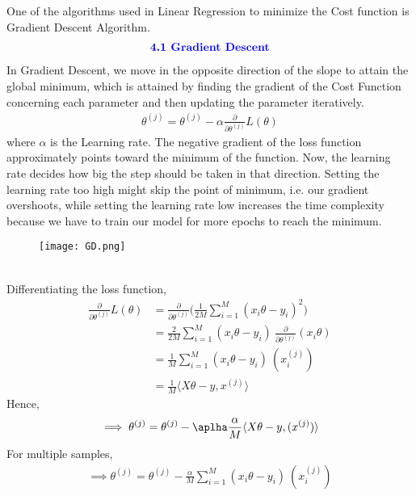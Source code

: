 \documentclass{homework}
\begin{document}
One of the algorithms used in Linear Regression to minimize the Cost function is Gradient Descent Algorithm.
\begin{align*}
   \textcolor{blue}{ \text{{\textbf{4.1 Gradient Descent}}}}
\end{align*}
In Gradient Descent, we move in the opposite direction of the slope to attain the global minimum, which is attained by finding the gradient of the Cost Function concerning each parameter and then updating the parameter iteratively.
\begin{align*}
    \theta^{(j)} = \theta^{(j)} - \alpha \frac{\partial}{\partial\theta^{(j)}}L(\theta)
\end{align*}
where $\alpha$ is the Learning rate. The negative gradient of the loss function approximately points toward the minimum of the function. Now, the learning rate decides how big the step should be taken in that direction. Setting the learning rate too high might skip the point of minimum, i.e. our gradient overshoots, while setting the learning rate low increases the time complexity because we have to train our model for more epochs to reach the minimum.\\
\begin{figure}[h]
\centering
\texttt{[image: GD.png]}\\
\end{figure}\\
Differentiating the loss function,
\begin{align*}
    \frac{\partial}{\partial\theta^{(j)}}L(\theta) &= \frac{\partial}{\partial\theta^{(j)}}\bigg(\frac{1}{2M}\displaystyle\sum^{M}_{i = 1}(x_{i}\theta -y_i)^2\bigg)\\
    &= \frac{2}{2M}\displaystyle\sum^{M}_{i = 1}(x_{i}\theta -y_i)\ \frac{\partial}{\partial\theta^{(j)}}(x_{i}\theta)\\
    &= \frac{1}{M}\displaystyle\sum^{M}_{i = 1}(x_{i}\theta -y_i)\ (x^{(j)}_{i})\\
    &= \frac{1}{M}\langle X\theta -y , x^{(j)}\rangle
\end{align*}
Hence,
\begin{equation*}
    \implies \theta^{(j)} = \theta^{(j)} - \aplha \frac{\alpha}{M}\langle X\theta -y, (x^{(j)}) \rangle
\end{equation*}
For multiple samples,
\begin{align*}
\implies \theta^{(j)} = \theta^{(j)} - \frac{\alpha}{M}\displaystyle\sum_{i = 1}^{M}(x_i\theta  -y_i)\ (x_i^{(j)})
\end{align*}
\end{document}
